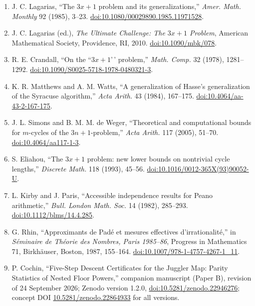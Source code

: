 \documentclass[12pt]{article}
\begin{document}
\begin{enumerate}
\item
  J. C. Lagarias, ``The \(3x+1\) problem and its generalizations,''
  \emph{Amer. Math. Monthly} 92 (1985), 3--23.
  \href{https://doi.org/10.1080/00029890.1985.11971528}{doi:10.1080/00029890.1985.11971528}.
\item
  J. C. Lagarias (ed.), \emph{The Ultimate Challenge: The \(3x+1\)
  Problem}, American Mathematical Society, Providence, RI, 2010.
  \href{https://doi.org/10.1090/mbk/078}{doi:10.1090/mbk/078}.
\item
  R. E. Crandall, ``On the ``\(3x+1\)'\,' problem,'' \emph{Math. Comp.}
  32 (1978), 1281--1292.
  \href{https://doi.org/10.1090/S0025-5718-1978-0480321-3}{doi:10.1090/S0025-5718-1978-0480321-3}.
\item
  K. R. Matthews and A. M. Watts, ``A generalization of Hasse's
  generalization of the Syracuse algorithm,'' \emph{Acta Arith.} 43
  (1984), 167--175.
  \href{https://doi.org/10.4064/aa-43-2-167-175}{doi:10.4064/aa-43-2-167-175}.
\item
  J. L. Simons and B. M. M. de Weger, ``Theoretical and computational
  bounds for \(m\)-cycles of the \(3n+1\)-problem,'' \emph{Acta Arith.}
  117 (2005), 51--70.
  \href{https://doi.org/10.4064/aa117-1-3}{doi:10.4064/aa117-1-3}.
\item
  S. Eliahou, ``The \(3x+1\) problem: new lower bounds on nontrivial
  cycle lengths,'' \emph{Discrete Math.} 118 (1993), 45--56.
  \href{https://doi.org/10.1016/0012-365X(93)90052-U}{doi:10.1016/0012-365X(93)90052-U}.
\item
  L. Kirby and J. Paris, ``Accessible independence results for Peano
  arithmetic,'' \emph{Bull. London Math. Soc.} 14 (1982), 285--293.
  \href{https://doi.org/10.1112/blms/14.4.285}{doi:10.1112/blms/14.4.285}.
\item
  G. Rhin, ``Approximants de Pad\'{e} et mesures effectives
  d'irrationalit\'{e},'' in \emph{S\'{e}minaire de Th\'{e}orie des
  Nombres, Paris 1985--86}, Progress in Mathematics 71, Birkh\"{a}user,
  Boston, 1987, 155--164.
  \href{https://doi.org/10.1007/978-1-4757-4267-1_11}{doi:10.1007/978-1-4757-4267-1\_11}.
\item
  P. Cochin, ``Five-Step Descent Certificates for the Juggler Map:
  Parity Statistics of Nested Floor Powers,'' companion manuscript
  (Paper B), revision of 24 September 2026; Zenodo version 1.2.0,
  \href{https://doi.org/10.5281/zenodo.22946276}{doi:10.5281/zenodo.22946276};
  concept DOI
  \href{https://doi.org/10.5281/zenodo.22864933}{10.5281/zenodo.22864933}
  for all versions.

\end{enumerate}
\end{document}
